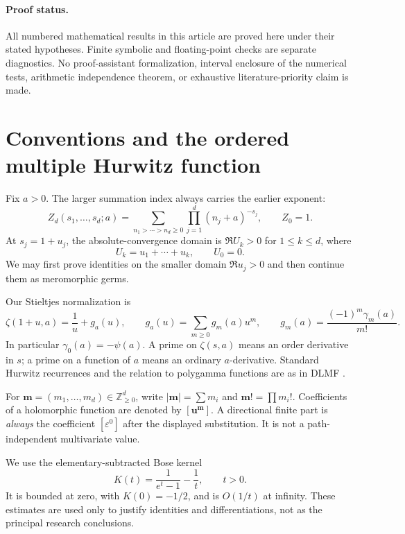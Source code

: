 \documentclass[11pt,a4paper]{article}
\numberwithin{equation}{section}
\theoremstyle{definition}\newtheorem{definition}[theorem]{Definition}
\theoremstyle{remark}\newtheorem{remark}[theorem]{Remark}
\newcommand{\eps}{\varepsilon}
\begin{document}
\paragraph{Proof status.}
All numbered mathematical results in this article are proved here under
their stated hypotheses. Finite symbolic and floating-point checks are
separate diagnostics. No proof-assistant formalization, interval enclosure
of the numerical tests, arithmetic independence theorem, or exhaustive
literature-priority claim is made.

\section{Conventions and the ordered multiple Hurwitz function}
\label{sec:notation}

Fix $a>0$. The larger summation index always carries the earlier exponent:
\begin{equation}\label{eq:Zd}
 Z_d(s_1,\ldots,s_d;a)
 =\sum_{n_1>\cdots>n_d\ge0}\prod_{j=1}^{d}(n_j+a)^{-s_j},
 \qquad Z_0=1.
\end{equation}
At $s_j=1+u_j$, the absolute-convergence domain is
$\Re U_k>0$ for $1\le k\le d$, where
\begin{equation}\label{eq:prefix}
 U_k=u_1+\cdots+u_k,\qquad U_0=0.
\end{equation}
We may first prove identities on the smaller domain $\Re u_j>0$ and then
continue them as meromorphic germs.

Our Stieltjes normalization is
\begin{equation}\label{eq:g}
 \zeta(1+u,a)=\frac1u+g_a(u),\qquad
 g_a(u)=\sum_{m\ge0}g_m(a)u^m,
 \qquad g_m(a)=\frac{(-1)^m\gamma_m(a)}{m!}.
\end{equation}
In particular $\gamma_0(a)=-\psi(a)$. A prime on $\zeta(s,a)$ means
an order derivative in $s$; a prime on a function of $a$ means an ordinary
$a$-derivative. Standard Hurwitz recurrences and the relation to
polygamma functions are as in DLMF \cite{dlmf-zeta}.

For $\bm m=(m_1,\ldots,m_d)\in\mathbb Z_{\ge0}^d$, write
$|\bm m|=\sum m_i$ and $\bm m!=\prod m_i!$. Coefficients of a holomorphic
function are denoted by $[\bm u^{\bm m}]$. A directional finite part is
\emph{always} the coefficient $[\eps^0]$ after the displayed substitution.
It is not a path-independent multivariate value.

We use the elementary-subtracted Bose kernel
\begin{equation}\label{eq:kernel}
 K(t)=\frac1{e^t-1}-\frac1t,\qquad t>0.
\end{equation}
It is bounded at zero, with $K(0)=-1/2$, and is $O(1/t)$ at infinity.
These estimates are used only to justify identities and differentiations,
not as the principal research conclusions.
\end{document}
